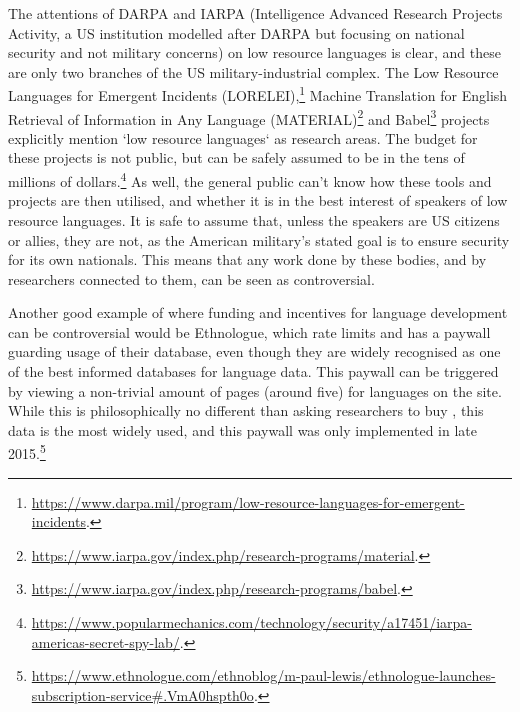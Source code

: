 The attentions of DARPA and IARPA (Intelligence Advanced Research Proj\-ects Activity, a US institution modelled after DARPA but focusing on national security and not military concerns) on low resource languages is clear, and these are only two branches of the US military-industrial complex. The Low Resource Languages for Emergent Incidents (LORELEI),\footnote{\href{https://www.darpa.mil/program/low-resource-languages-for-emergent-incidents}{https://www.darpa.mil/program/low-resource-languages-for-emergent-incidents}. } Machine Translation for English Retrieval of Information in Any Language (MATERIAL)\footnote{\href{https://www.iarpa.gov/index.php/research-programs/material}{https://www.iarpa.gov/index.php/research-programs/material}. } and Babel\footnote{\href{https://www.iarpa.gov/index.php/research-programs/babel}{https://www.iarpa.gov/index.php/research-programs/babel}. } projects explicitly mention `low resource languages` as research areas. The budget for these projects is not public, but can be safely assumed to be in the tens of millions of dollars.\footnote{\href{https://www.popularmechanics.com/technology/security/a17451/iarpa-americas-secret-spy-lab/}{https://www.popularmechanics.com/technology/security/a17451/iarpa-americas-secret-spy-lab/}. } As well, the general public can't know how these tools and projects are then utilised, and whether it is in the best interest of speakers of low resource languages. It is safe to assume that, unless the speakers are US citizens or allies, they are not, as the American military's stated goal is to ensure security for its own nationals. This means that any work done by these bodies, and by researchers connected to them, can be seen as controversial. 

Another good example of where funding and incentives for language development can be controversial would be Ethnologue, which rate limits and has a paywall guarding usage of their database, even though they are widely recognised as one of the best informed databases for language data. This paywall can be triggered by viewing a non-trivial amount of pages (around five) for languages on the site. While this is philosophically no different than asking researchers to buy \citet{lewis2009ethnologue}, this data is the most widely used, and this paywall was only implemented in late 2015.\footnote{\href{https://www.ethnologue.com/ethnoblog/m-paul-lewis/ethnologue-launches-subscription-service\#.VmA0hspth0o}{https://www.ethnologue.com/ethnoblog/m-paul-lewis/ethnologue-launches-subscription-service\#.VmA0hspth0o}. }

